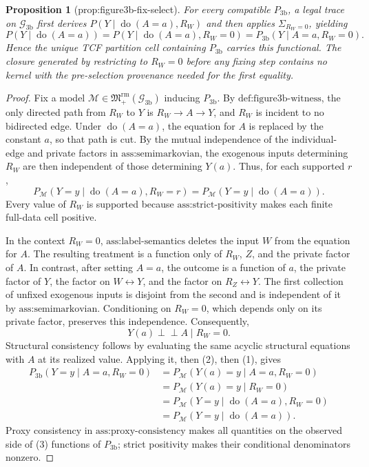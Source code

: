 \documentclass{article}
\newtheorem{proposition}{Proposition}
\begin{document}
\begin{proposition}[prop:figure3b-fix-select]\label{prop:figure3b-fix-select}
For every compatible \(P_{\mathrm{3b}}\), a legal trace on \(\mathcal G_{\mathrm{3b}}\) first derives \(P(Y\mid\operatorname{do}(A=a),R_W)\) and then applies \(\Sigma_{R_W=0}\), yielding \[P(Y\mid\operatorname{do}(A=a))=P(Y\mid\operatorname{do}(A=a),R_W=0)=P_{\mathrm{3b}}(Y\mid A=a,R_W=0).\] Hence the unique TCF partition cell containing \(P_{\mathrm{3b}}\) carries this functional. The closure generated by restricting to \(R_W=0\) before any fixing step contains no kernel with the pre-selection provenance needed for the first equality.
\end{proposition}
\begin{proof}
Fix a model \(\mathcal M\in\mathfrak M_{+}^{\mathrm{rm}}(\mathcal G_{\mathrm{3b}})\) inducing \(P_{\mathrm{3b}}\).  By \(\text{def:figure3b-witness}\), the only directed path from \(R_W\) to \(Y\) is \(R_W\to A\to Y\), and \(R_W\) is incident to no bidirected edge.  Under \(\operatorname{do}(A=a)\), the equation for \(A\) is replaced by the constant \(a\), so that path is cut.  By the mutual independence of the individual-edge and private factors in \(\text{ass:semimarkovian}\), the exogenous inputs determining \(R_W\) are then independent of those determining \(Y(a)\).  Thus, for each supported \(r\),
\[
P_{\mathcal M}(Y=y\mid\operatorname{do}(A=a),R_W=r)
=P_{\mathcal M}(Y=y\mid\operatorname{do}(A=a)).
\tag{1}
\]
Every value of \(R_W\) is supported because \(\text{ass:strict-positivity}\) makes each finite full-data cell positive.

In the context \(R_W=0\), \(\text{ass:label-semantics}\) deletes the input \(W\) from the equation for \(A\).  The resulting treatment is a function only of \(R_W\), \(Z\), and the private factor of \(A\).  In contrast, after setting \(A=a\), the outcome is a function of \(a\), the private factor of \(Y\), the factor on \(W\leftrightarrow Y\), and the factor on \(R_Z\leftrightarrow Y\).  The first collection of unfixed exogenous inputs is disjoint from the second and is independent of it by \(\text{ass:semimarkovian}\).  Conditioning on \(R_W=0\), which depends only on its private factor, preserves this independence.  Consequently,
\[
Y(a)\mathbin{\perp\!\!\!\perp}A\mid R_W=0.
\tag{2}
\]
Structural consistency follows by evaluating the same acyclic structural equations with \(A\) at its realized value.  Applying it, then (2), then (1), gives
\[
\begin{aligned}
P_{\mathrm{3b}}(Y=y\mid A=a,R_W=0)
&=P_{\mathcal M}(Y(a)=y\mid A=a,R_W=0)\\
&=P_{\mathcal M}(Y(a)=y\mid R_W=0)\\
&=P_{\mathcal M}(Y=y\mid\operatorname{do}(A=a),R_W=0)\\
&=P_{\mathcal M}(Y=y\mid\operatorname{do}(A=a)).
\end{aligned}
\tag{3}
\]
Proxy consistency in \(\text{ass:proxy-consistency}\) makes all quantities on the observed side of (3) functions of \(P_{\mathrm{3b}}\); strict positivity makes their conditional denominators nonzero.


\end{proof}
\end{document}
